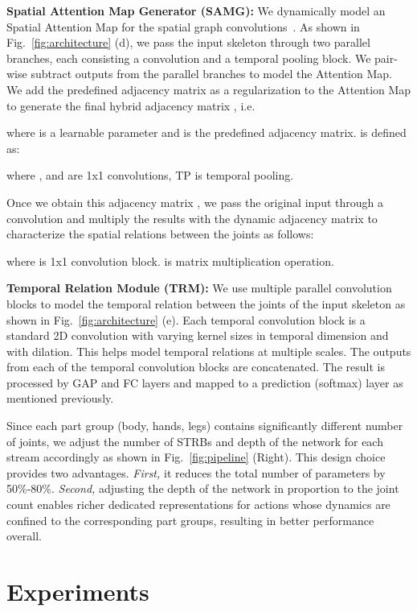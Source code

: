 \documentclass[runningheads]{llncs}
\begin{document}
\noindent \textbf{Spatial Attention Map Generator (SAMG): } We dynamically model an Spatial Attention Map for the spatial graph convolutions~\cite{chen2021channel,shi2019skeleton}. As shown in  Fig.~\ref{fig:architecture} (d), we pass the input skeleton through two parallel branches, each consisting a  convolution and a temporal pooling block. We  pair-wise subtract outputs from the parallel branches to model the Attention Map. We add the predefined adjacency matrix  as a regularization to the Attention Map to generate the final hybrid adjacency matrix , i.e.


where  is a learnable parameter and  is the predefined adjacency matrix.  is defined as:


where ,  and  are 1x1 convolutions, TP is temporal pooling.

Once we obtain this adjacency matrix , we pass the original input through a  convolution and multiply the results with the dynamic adjacency matrix to characterize the spatial relations between the joints as follows: 


where  is 1x1 convolution block.  is matrix multiplication operation.

\noindent \textbf{Temporal Relation Module (TRM):} We use multiple parallel convolution blocks to model the temporal relation between the joints of the input skeleton as shown in Fig.~\ref{fig:architecture} (e). Each temporal convolution block is a standard 2D convolution with varying kernel sizes in temporal dimension and with dilation. This helps model temporal relations at multiple scales. The outputs from each of the temporal convolution blocks are concatenated. The result is processed by GAP and FC layers and mapped to a prediction (softmax) layer as mentioned previously.  

Since each part group (body, hands, legs) contains significantly different number of joints, we adjust the number of STRBs and depth of the network for each stream accordingly as shown in Fig.~\ref{fig:pipeline} (Right). This design choice provides two advantages. \textit{First,} it reduces the total number of parameters by 50\%-80\%. \textit{Second,} adjusting the depth of the network in proportion to the joint count enables richer dedicated representations for actions whose dynamics are confined to the corresponding part groups, resulting in better performance overall.





\section{Experiments}
\label{sec:experiments}
\end{document}
